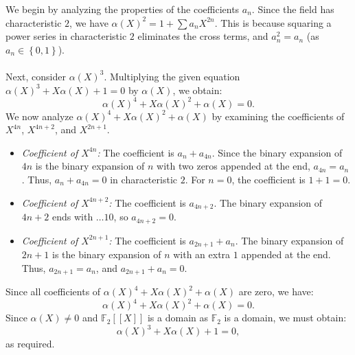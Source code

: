 \begin{solution}
    We begin by analyzing the properties of the coefficients \( a_n \). Since the field has characteristic \( 2 \), we have \( \alpha\left(X\right)^2 = 1 + \sum a_n X^{2n} \). This is because squaring a power series in characteristic \( 2 \) eliminates the cross terms, and \( a_n^2 = a_n \) (as \( a_n \in \left\{0, 1\right\} \)).
    \\\\
    Next, consider \( \alpha\left(X\right)^3 \). Multiplying the given equation \( \alpha\left(X\right)^3 + X \alpha\left(X\right) + 1 = 0 \) by \( \alpha\left(X\right) \), we obtain:
    \[
        \alpha\left(X\right)^4 + X \alpha\left(X\right)^2 + \alpha\left(X\right) = 0.
    \]
    We now analyze \( \alpha\left(X\right)^4 + X \alpha\left(X\right)^2 + \alpha\left(X\right) \) by examining the coefficients of \( X^{4n} \), \( X^{4n+2} \), and \( X^{2n+1} \).
    \begin{itemize}
        \item \textit{Coefficient of \( X^{4n} \):} The coefficient is \( a_n + a_{4n} \). Since the binary expansion of \( 4n \) is the binary expansion of \( n \) with two zeros appended at the end, \( a_{4n} = a_n \). Thus, \( a_n + a_{4n} = 0 \) in characteristic \( 2 \). For \( n = 0 \), the coefficient is \( 1 + 1 = 0 \).

        \item \textit{Coefficient of \( X^{4n+2} \):} The coefficient is \( a_{4n+2} \). The binary expansion of \( 4n+2 \) ends with \( \dots 10 \), so \( a_{4n+2} = 0 \).

        \item \textit{Coefficient of \( X^{2n+1} \):} The coefficient is \( a_{2n+1} + a_n \). The binary expansion of \( 2n+1 \) is the binary expansion of \( n \) with an extra \( 1 \) appended at the end. Thus, \( a_{2n+1} = a_n \), and \( a_{2n+1} + a_n = 0 \).
    \end{itemize}
    Since all coefficients of \( \alpha\left(X\right)^4 + X \alpha\left(X\right)^2 + \alpha\left(X\right) \) are zero, we have:
    \[
        \alpha\left(X\right)^4 + X \alpha\left(X\right)^2 + \alpha\left(X\right) = 0.
    \]
    Since \( \alpha\left(X\right) \neq 0 \) and \( \mathbb{F}_{2}\left[\left[X\right]\right] \) is a domain as \( \mathbb{F}_{2} \) is a domain, we must obtain:
    \[
        \alpha\left(X\right)^3 + X \alpha\left(X\right) + 1 = 0,
    \]
    as required.
\end{solution}
